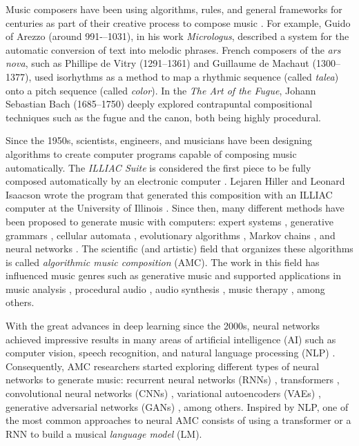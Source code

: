 Music composers have been using algorithms, rules, and general frameworks for centuries as part of their creative process to compose music \cite{nierhaus2009algorithmic}. For example, Guido of Arezzo (around 991-–1031), in his work \textit{Micrologus}, described a system for the automatic conversion of text into melodic phrases. French composers of the \textit{ars nova}, such as Phillipe de Vitry (1291--1361) and Guillaume de Machaut (1300--1377), used isorhythms as a method to map a rhythmic sequence (called \textit{talea}) onto a pitch sequence (called \textit{color}). In the \textit{The Art of the Fugue}, Johann Sebastian Bach (1685--1750) deeply explored contrapuntal compositional techniques such as the fugue and the canon, both being highly procedural.

Since the 1950s, scientists, engineers, and musicians have been designing algorithms to create computer programs capable of composing music automatically. The \textit{ILLIAC Suite} is considered the first piece to be fully composed automatically by an electronic computer \cite{nierhaus2009algorithmic}. Lejaren Hiller and Leonard Isaacson wrote the program that generated this composition with an ILLIAC computer at the University of Illinois \cite{hiller1957musical}. Since then, many different methods have been proposed to generate music with computers: expert systems \cite{ebciouglu1988expert}, generative grammars \cite{keller2007grammatical}, cellular automata \cite{ball2005making}, evolutionary algorithms \cite{horner1991genetic}, Markov chains \cite{brooks1957}, and neural networks \cite{todd1989connectionist}. The scientific (and artistic) field that organizes these algorithms is called \textit{algorithmic music composition} (AMC). The work in this field has influenced music genres such as generative music \cite{eno1996generative} and supported applications in music analysis \cite{lerdahl1996generative}, procedural audio \cite{farnell2007introduction}, audio synthesis \cite{engel2017neural}, music therapy \cite{williams2020use}, among others.

With the great advances in deep learning since the 2000s, neural networks achieved impressive results in many areas of artificial intelligence (AI) such as computer vision, speech recognition, and natural language processing (NLP) \cite{goodfellow2016deep}. Consequently, AMC researchers started exploring different types of neural networks to generate music: recurrent neural networks (RNNs) \cite{oore2017learning}, transformers \cite{huang2018music}, convolutional neural networks (CNNs) \cite{huang2019counterpoint}, variational autoencoders (VAEs) \cite{roberts2018hierarchical}, generative adversarial networks (GANs) \cite{dong2018musegan}, among others. Inspired by NLP, one of the most common approaches to neural AMC consists of using a transformer or a RNN to build a musical \textit{language model} (LM).

